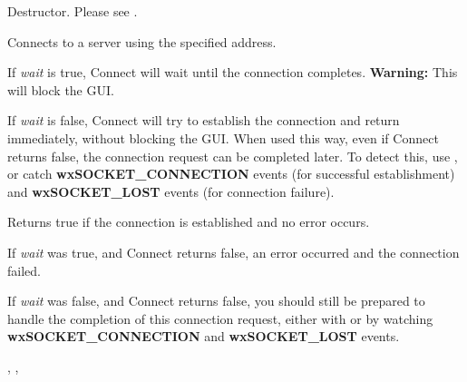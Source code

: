 Destructor. Please see .

%
%
\label{wxsocketclientconnect}



Connects to a server using the specified address.

If {\it wait} is true, Connect will wait until the connection
completes. {\bf Warning:} This will block the GUI.

If {\it wait} is false, Connect will try to establish the connection and
return immediately, without blocking the GUI. When used this way, even if
Connect returns false, the connection request can be completed later.
To detect this, use ,
or catch {\bf wxSOCKET\_CONNECTION} events (for successful establishment)
and {\bf wxSOCKET\_LOST} events (for connection failure).






Returns true if the connection is established and no error occurs.

If {\it wait} was true, and Connect returns false, an error occurred
and the connection failed.

If {\it wait} was false, and Connect returns false, you should still
be prepared to handle the completion of this connection request, either
with  or by
watching {\bf wxSOCKET\_CONNECTION} and {\bf wxSOCKET\_LOST} events.


, 
, 

